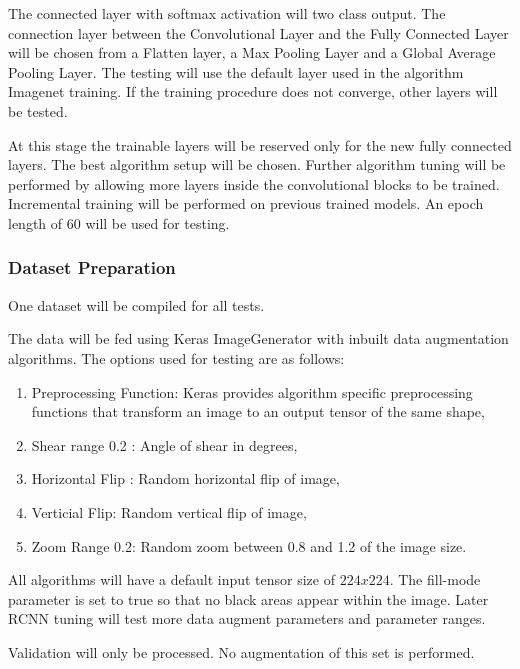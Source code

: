 \documentclass{IEEEtran}
\begin{document}
The connected layer with softmax activation will two class output. The connection layer between the Convolutional Layer and the Fully Connected Layer will be chosen from a Flatten layer, a Max Pooling Layer and a Global Average Pooling Layer. The testing will use the default layer used in the algorithm Imagenet training. If the training procedure does not converge, other layers will be tested.\newline

At this stage the trainable layers will be reserved only for the new fully connected layers. The best algorithm setup will be chosen. Further algorithm tuning will be performed by allowing more layers inside the convolutional blocks to be trained. Incremental training will be performed on previous trained models. An epoch length of 60 will be used for testing. \newline

\subsubsection{Dataset Preparation}

One dataset will be compiled for all tests.

The data will be fed using Keras ImageGenerator with inbuilt data augmentation algorithms. The options used for testing are as follows:
\begin{enumerate}
\item Preprocessing Function: Keras provides algorithm specific preprocessing functions that transform an image to an output tensor of the same shape,
\item Shear range 0.2 : Angle of shear in degrees,
\item Horizontal Flip : Random horizontal flip of image,
\item Verticial Flip: Random vertical flip of image,
\item Zoom Range 0.2: Random zoom between 0.8 and 1.2 of the image size.
\end{enumerate}

All algorithms will have a default input tensor size of $224 x 224$.
The fill-mode parameter is set to true so that no black areas appear within the image. Later RCNN tuning will test more data augment parameters and parameter ranges. \newline

Validation will only be processed. No augmentation of this set is performed.\newline
\end{document}
